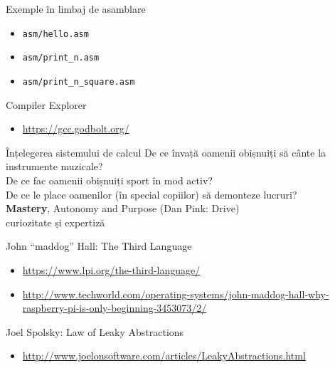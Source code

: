 \documentclass{beamer}
\begin{document}
\begin{frame}{Exemple în limbaj de asamblare}
  \begin{itemize}
    \item \texttt{asm/hello.asm}
    \item \texttt{asm/print\_n.asm}
    \item \texttt{asm/print\_n\_square.asm}
  \end{itemize}
\end{frame}

\begin{frame}{Compiler Explorer}
  \begin{itemize}
    \item \url{https://gcc.godbolt.org/}
  \end{itemize}
\end{frame}

\begin{frame}{Înțelegerea sistemului de calcul}
  \centering
  \pause De ce învață oamenii obișnuiți să cânte la instrumente muzicale? \\
  \pause De ce fac oamenii obișnuiți sport în mod activ? \\
  \pause De ce le place oamenilor (în special copiilor) să demonteze lucruri? \\
  \vspace{5mm}
  \pause \textbf{Mastery}, Autonomy and Purpose (Dan Pink: Drive)\\
  \vspace{5mm}
  \pause curiozitate și expertiză
\end{frame}

\begin{frame}{John ``maddog'' Hall: The Third Language}
  \begin{itemize}
    \item \footnotesize{\url{https://www.lpi.org/the-third-language/}}
    \item \footnotesize{\url{http://www.techworld.com/operating-systems/john-maddog-hall-why-raspberry-pi-is-only-beginning-3453073/2/}}
  \end{itemize}
\end{frame}

\begin{frame}{Joel Spolsky: Law of Leaky Abstractions}
  \begin{itemize}
    \item \footnotesize{\url{http://www.joelonsoftware.com/articles/LeakyAbstractions.html}}
  \end{itemize}
\end{frame}
\end{document}
